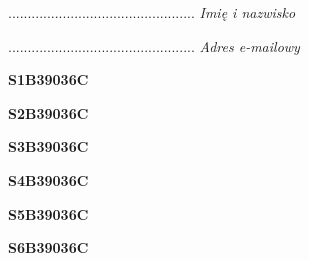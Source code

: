 \begin{turn}{90}\begin{minipage}{\linewidth} \vspace{20mm} ................................................  \textit{Imię i nazwisko}\end{minipage}\end{turn}

\begin{turn}{90}\begin{minipage}{\linewidth} \vspace{20mm} ................................................  \textit{Adres e-mailowy}\end{minipage}\end{turn}

\begin{turn}{90}\huge \begin{minipage}{\linewidth} \vspace{10mm}\textbf{S1B39036C}\end{minipage}\end{turn}

\begin{turn}{90}\huge \begin{minipage}{\linewidth} \vspace{10mm}\textbf{S2B39036C}\end{minipage}\end{turn}

\begin{turn}{90}\huge \begin{minipage}{\linewidth} \vspace{10mm}\textbf{S3B39036C}\end{minipage}\end{turn}

\begin{turn}{90}\huge \begin{minipage}{\linewidth} \vspace{10mm}\textbf{S4B39036C}\end{minipage}\end{turn}

\begin{turn}{90}\huge \begin{minipage}{\linewidth} \vspace{10mm}\textbf{S5B39036C}\end{minipage}\end{turn}

\begin{turn}{90}\huge \begin{minipage}{\linewidth} \vspace{10mm}\textbf{S6B39036C}\end{minipage}\end{turn}

